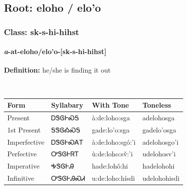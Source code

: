 \needspace{4in}
\subsection*{Root: eloho / elo'o}
\nopagebreak
{}
\needspace{3in}
\subsubsection*{Class: sk-s-hi-hihst}
\nopagebreak
\needspace{2in}
\paragraph*{\textit{a}{-}at{-}\textbf{eloho/elo'o}{-}[sk-s-hi-hihst]}
\nopagebreak
\textbf{Definition: } he/she is finding it out
\\[0.5em]
\begin{tabularx}{\textwidth}{l X X X}%
\toprule%
\textbf{Form}&\textbf{Syllabary}&\textbf{With Tone}&\textbf{Toneless}\\%
\midrule%
Present&ᎠᏕᎶᎰᏍᎦ&à:de:loho:sga&adelohosga\\%
1st Present&ᎦᏕᎶᎣᏍᎦ&gade:lo’o:sga&gadelo’osga\\%
Imperfective&ᎠᏕᎶᎰᏍᎪᎢ&à:de:loho:sgó:’i&adelohosgo’i\\%
Perfective&ᎤᏕᎶᎰᏒᎢ&ù:de:loho:sv̌:’i&udelohosv’i\\%
Imperative&ᎭᏕᎶᎰᎯ&hade:lohǒ:hi&hadelohohi\\%
Infinitive&ᎤᏕᎶᎰᎯᏍᏗ&u:de:loho:hísdi&udelohohisdi\\%
\bottomrule%
\end{tabularx}
\\[1em]